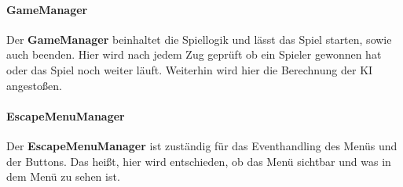 \paragraph{GameManager}
Der \textbf{GameManager} beinhaltet die Spiellogik und lässt das Spiel starten, sowie auch beenden. Hier wird nach jedem Zug geprüft ob ein Spieler gewonnen hat oder das Spiel noch weiter läuft. Weiterhin wird hier die Berechnung der KI angestoßen.
\paragraph{EscapeMenuManager}
Der \textbf{EscapeMenuManager} ist zuständig für das Eventhandling des Menüs und der Buttons. Das heißt, hier wird entschieden, ob das Menü sichtbar und was in dem Menü zu sehen ist.

